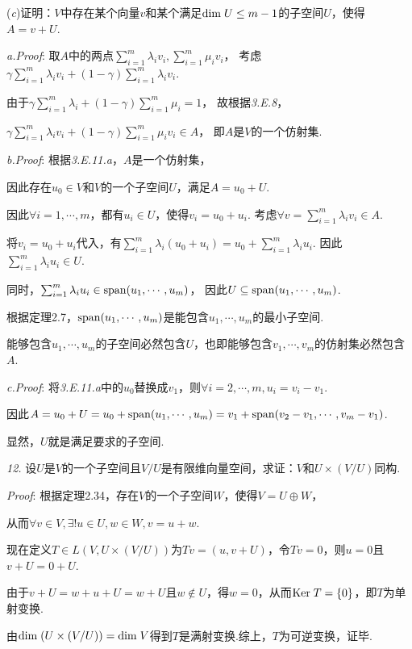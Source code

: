 (\textit{c})证明：$V$中存在某个向量$v$和某个满足$\mathrm{dim \;} U \leq m-1$的子空间$U$，使得$A=v+U$.

\textit{a.Proof}:
取$A$中的两点$\sum_{i=1}^m \lambda_i v_i,\sum_{i=1}^m \mu_i v_i$，
考虑$\gamma \sum_{i=1}^m \lambda_i v_i+(1-\gamma)\sum_{i=1}^m \lambda_i v_i$.

由于$\gamma \sum_{i=1}^m \lambda_i+(1-\gamma)\sum_{i=1}^m \mu_i=1$，
故根据\textit{3.E.8}，

$\gamma \sum_{i=1}^m \lambda_i v_i+(1-\gamma)\sum_{i=1}^m \mu_i v_i \in A$，
即$A$是$V$的一个仿射集.

\textit{b.Proof}:
根据\textit{3.E.11.a}，$A$是一个仿射集，

因此存在$u_0 \in V$和$V$的一个子空间$U$，满足$A=u_0+U$.

因此$\forall i=1,\cdots,m$，都有$u_i \in U$，使得$v_i=u_0+u_i$.
考虑$\forall v=\sum_{i=1}^m \lambda_i v_i \in A$.

将$v_i=u_0+u_i$代入，有$\sum_{i=1}^m \lambda_i(u_0+u_i)=u_0+\sum_{i=1}^m \lambda_i u_i$.
因此$\sum_{i=1}^m \lambda_i u_i \in U$.

同时，$\sum_{i=1}^m \lambda_i u_i \in \mathrm{span} (u_1,\cdots,u_m)$，
因此$U \subseteq \mathrm{span} (u_1,\cdots,u_m)$.

根据定理2.7，$\mathrm{span} (u_1,\cdots,u_m)$是能包含$u_1,\cdots,u_m$的最小子空间.

能够包含$u_1,\cdots,u_m$的子空间必然包含$U$，也即能够包含$v_1,\cdots,v_m$的仿射集必然包含$A$.

\textit{c.Proof}:
将\textit{3.E.11.a}中的$u_0$替换成$v_1$，则$\forall i=2,\cdots,m,u_i=v_i-v_1$.

因此$A=u_0+U=u_0+\mathrm{span} (u_1,\cdots,u_m)=v_1+\mathrm{span} (v_2-v_1,\cdots,v_m-v_1)$.

显然，$U$就是满足要求的子空间.

\hspace*{\fill}

\textit{12.}
设$U$是$V$的一个子空间且$V/U$是有限维向量空间，求证：$V$和$U \times (V/U)$同构.

\textit{Proof}:
根据定理2.34，存在$V$的一个子空间$W$，使得$V=U \oplus W$，

从而$\forall v \in V, \exists! u \in U,w \in W,v=u+w$.

现在定义$T \in L(V,U \times (V/U))$为$Tv=(u,v+U)$，令$Tv=0$，则$u=0$且$v+U=0+U$.

由于$v+U=w+u+U=w+U$且$w \notin U$，得$w=0$，从而$\mathrm{Ker \;} T=\{0\}$，即$T$为单射变换.

由$\mathrm{dim \;} (U \times (V/U))=\mathrm{dim \;} V$得到$T$是满射变换.综上，$T$为可逆变换，证毕.

